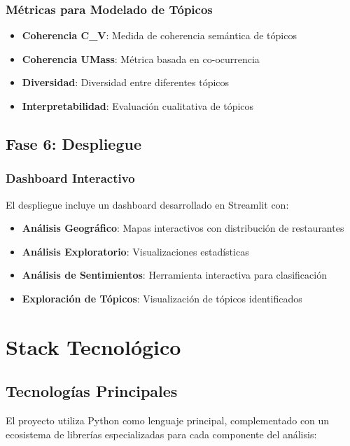 \documentclass[12pt,a4paper,twoside,openany]{book}
\begin{document}
\subsubsection{Métricas para Modelado de Tópicos}

\begin{itemize}
    \item \textbf{Coherencia C\_V}: Medida de coherencia semántica de tópicos
    \item \textbf{Coherencia UMass}: Métrica basada en co-ocurrencia
    \item \textbf{Diversidad}: Diversidad entre diferentes tópicos
    \item \textbf{Interpretabilidad}: Evaluación cualitativa de tópicos
\end{itemize}

\subsection{Fase 6: Despliegue}

\subsubsection{Dashboard Interactivo}

El despliegue incluye un dashboard desarrollado en Streamlit con:

\begin{itemize}
    \item \textbf{Análisis Geográfico}: Mapas interactivos con distribución de restaurantes
    \item \textbf{Análisis Exploratorio}: Visualizaciones estadísticas
    \item \textbf{Análisis de Sentimientos}: Herramienta interactiva para clasificación
    \item \textbf{Exploración de Tópicos}: Visualización de tópicos identificados
\end{itemize}

\section{Stack Tecnológico}

\subsection{Tecnologías Principales}

El proyecto utiliza Python como lenguaje principal, complementado con un ecosistema de librerías especializadas para cada componente del análisis:
\end{document}
